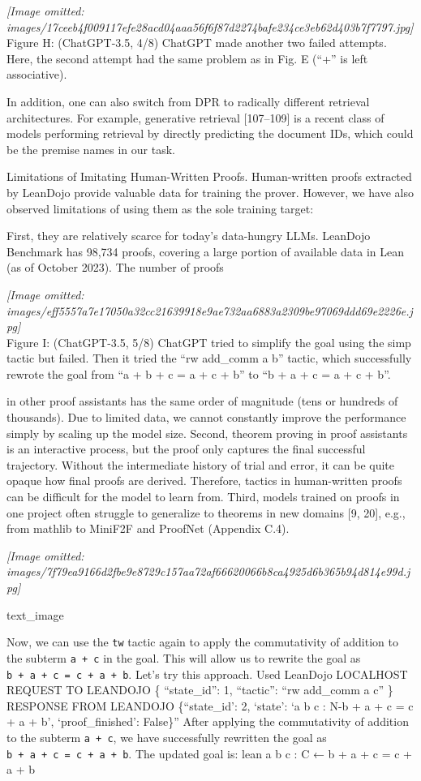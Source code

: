 \documentclass[
]{article}
\begin{document}
\textit{[Image omitted: images/17ceeb4f009117efe28acd04aaa56f6f87d2274bafe234ce3eb62d403b7f7797.jpg]}\\
Figure H: (ChatGPT-3.5, 4/8) ChatGPT made another two failed attempts.
Here, the second attempt had the same problem as in Fig. E (``+'' is
left associative).

In addition, one can also switch from DPR to radically different
retrieval architectures. For example, generative retrieval
{[}107--109{]} is a recent class of models performing retrieval by
directly predicting the document IDs, which could be the premise names
in our task.

Limitations of Imitating Human-Written Proofs. Human-written proofs
extracted by LeanDojo provide valuable data for training the prover.
However, we have also observed limitations of using them as the sole
training target:

First, they are relatively scarce for today's data-hungry LLMs. LeanDojo
Benchmark has 98,734 proofs, covering a large portion of available data
in Lean (as of October 2023). The number of proofs

\textit{[Image omitted: images/eff5557a7e17050a32cc21639918e9ae732aa6883a2309be97069ddd69e2226e.jpg]}\\
Figure I: (ChatGPT-3.5, 5/8) ChatGPT tried to simplify the goal using
the simp tactic but failed. Then it tried the ``rw add\_comm a b''
tactic, which successfully rewrote the goal from ``a + b + c = a + c +
b'' to ``b + a + c = a + c + b''.

in other proof assistants has the same order of magnitude (tens or
hundreds of thousands). Due to limited data, we cannot constantly
improve the performance simply by scaling up the model size. Second,
theorem proving in proof assistants is an interactive process, but the
proof only captures the final successful trajectory. Without the
intermediate history of trial and error, it can be quite opaque how
final proofs are derived. Therefore, tactics in human-written proofs can
be difficult for the model to learn from. Third, models trained on
proofs in one project often struggle to generalize to theorems in new
domains {[}9, 20{]}, e.g., from mathlib to MiniF2F and ProofNet
(Appendix C.4).

\textit{[Image omitted: images/7f79ea9166d2fbe9e8729c157aa72af66620066b8ca4925d6b365b94d814e99d.jpg]}

text\_image

Now, we can use the \texttt{tw} tactic again to apply the commutativity
of addition to the subterm \texttt{a\ +\ c} in the goal. This will allow
us to rewrite the goal as \texttt{b\ +\ a\ +\ c\ =\ c\ +\ a\ +\ b}.
Let's try this approach. Used LeanDojo LOCALHOST REQUEST TO LEANDOJO \{
``state\_id'': 1, ``tactic'': ``rw add\_comm a c'' \} RESPONSE FROM
LEANDOJO \{``state\_id': 2, `state': `a b c : N\n-b + a + c = c + a +
b', `proof\_finished': False\}'' After applying the commutativity of
addition to the subterm \texttt{a\ +\ c}, we have successfully rewritten
the goal as \texttt{b\ +\ a\ +\ c\ =\ c\ +\ a\ +\ b}. The updated goal
is: lean a b c : C ← b + a + c = c + a + b
\end{document}

